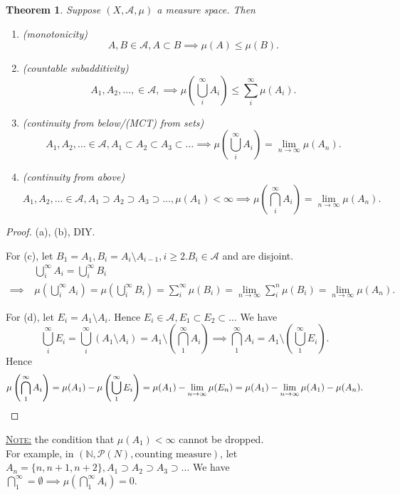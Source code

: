 \documentclass{report}
\newcommand{\N}{\mathbb{N}}
\newcommand{\fancyem}[1]{\underline{\textsc{#1}}}
\newtheorem{theorem}{Theorem}[chapter]
\theoremstyle{definition}
\theoremstyle{remark}
\begin{document}
\setcounter{theorem}{12}
\begin{theorem}
Suppose $(X,  \mathcal{A}, \mu)$ a measure space. Then
\begin{enumerate}
\item(monotonicity)
\[A, B \in \mathcal{A}, A \subset B \implies \mu(A) \leq \mu(B).\]
\item(countable subadditivity)
	\[A_1, A_2, \ldots, \in \mathcal{A}, \implies \mu\left(\bigcup_i^\infty A_i\right) \leq \sum_i^\infty \mu(A_i).\]
\item(continuity from below/(MCT) from sets)
	\[A_1, A_2, \ldots \in \mathcal{A}, A_1 \subset A_2 \subset A_3 \subset \ldots \implies \mu\left(\bigcup_i^\infty A_i\right) = \lim_{n \to \infty} \mu(A_n).\]
\item(continuity from above)
	\[A_1, A_2, \ldots \in \mathcal{A}, A_1 \supset A_2 \supset A_3 \supset \ldots, \mu(A_1) < \infty \implies \mu\left(\bigcap_i^\infty A_i\right) = \lim_{n \to \infty} \mu(A_n).\]
\end{enumerate}
\end{theorem}
\begin{proof}
    (a), (b), DIY.

    For (c), let $B_1 = A_1, B_i = A_i \setminus A_{i-1}, i \geq 2. B_i \in \mathcal{A}$ and are disjoint.
    \begin{align*}
        & \bigcup_i^\infty A_i = \bigcup_i^\infty B_i \\
        \implies\ & \mu\left(\bigcup_i^\infty A_i\right) = \mu\left(\bigcup_i^\infty B_i\right) = \sum_{i}^\infty \mu(B_i) = \lim_{n \to \infty} \sum_{i}^n \mu(B_i) = \lim_{n \to \infty} \mu(A_n).
    \end{align*}


For (d), let $E_i = A_1 \setminus A_i.$ Hence $E_i \in \mathcal{A}, E_1 \subset E_2 \subset \ldots$
We have
\[
\bigcup_i^\infty E_i = \bigcup_i^\infty (A_1 \setminus A_i) = A_1 \setminus \left(\bigcap_1^\infty A_i\right) \implies \bigcap_1^\infty A_i = A_1 \setminus \left(\bigcup_1^\infty E_i\right).
\]
Hence
\[
\mu\left(\bigcap_1^\infty A_i \right) = \mu(A_1) - \mu\left(\bigcup_1^\infty E_i\right) = \mu(A_1) - \lim_{n\to \infty}\mu(E_n) = \mu(A_1) - \lim_{n\to \infty} \mu(A_1) - \mu(A_n). \qedhere
\]
\end{proof}

\fancyem{Note:} the condition that $\mu(A_1) < \infty$ cannot be dropped. \\
For example,
in $(\N, \mathcal{P}(N), \text{counting measure})$, let $A_n = \{n, n+1, n+2\}, A_1 \supset A_2 \supset A_3 \supset \ldots$ We have $\bigcap_1^\infty = \emptyset \implies \mu\left(\bigcap_1^\infty A_i \right) = 0.$
\end{document}

